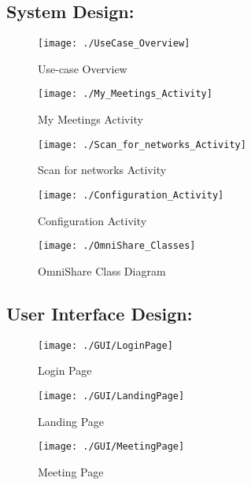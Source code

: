 \documentclass[12pt]{article}
\begin{document}
\subsection{System Design:}
\begin{figure}[htbp]
\centering
\texttt{[image: ./UseCase\_Overview]}
\caption{Use-case Overview}
\label{fig:UseCase_Overview}
\end{figure}
\newpage



\begin{figure}[htbp]
\centering
\texttt{[image: ./My\_Meetings\_Activity]}
\caption{My Meetings Activity}
\label{fig:My_Meetings_Activity}
\end{figure}

\newpage
\begin{figure}[htbp]
\centering
\texttt{[image: ./Scan\_for\_networks\_Activity]}
\caption{Scan for networks Activity}
\label{fig:Scan_for_networks_Activity}
\end{figure}
\newpage
\begin{figure}[htbp]
\centering
\texttt{[image: ./Configuration\_Activity]}
\caption{Configuration Activity}
\label{fig:Configuration_Activity}
\end{figure}
\newpage


\begin{figure}[htbp]
\centering
\texttt{[image: ./OmniShare\_Classes]}
\caption{OmniShare Class Diagram}
\label{fig:OmniShare_Classes}
\end{figure}

\newpage

\subsection{User Interface Design:}
\begin{figure}[htbp]
\centering
\texttt{[image: ./GUI/LoginPage]}
\caption{Login Page}
\label{fig:LoginPage}
\end{figure}
\newpage

\begin{figure}[htbp]
\centering
\texttt{[image: ./GUI/LandingPage]}
\caption{Landing Page}
\label{fig:LandingPage}
\end{figure}
\newpage

\begin{figure}[htbp]
\centering
\texttt{[image: ./GUI/MeetingPage]}
\caption{Meeting Page}
\label{fig:MeetingPage}
\end{figure}
\newpage
\end{document}
